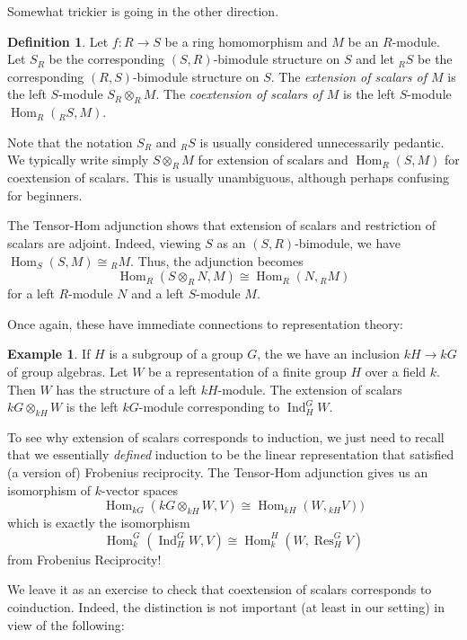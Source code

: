 \documentclass[12pt]{article}
\theoremstyle{plain}
\theoremstyle{definition}
\newtheorem{definition}[theorem]{Definition}
\newtheorem{example}[theorem]{Example}
\theoremstyle{remark}
\numberwithin{equation}{section}
\begin{document}
Somewhat trickier is going in the other direction.

\begin{definition}
Let $f : R \to S$ be a ring homomorphism and $M$ be an $R$-module.
Let $S_R$ be the corresponding $(S,R)$-bimodule structure on $S$
and let ${}_RS$ be the corresponding $(R,S)$-bimodule structure on $S$.
The \emph{extension of scalars of $M$}
is the left $S$-module $S_R \otimes_R M$.
The \emph{coextension of scalars of $M$}
is the left $S$-module $\operatorname{Hom}_R({}_RS,M)$.
\end{definition}

Note that the notation $S_R$ and ${}_RS$ is usually considered
unnecessarily pedantic.
We typically write simply $S \otimes_R M$ for extension of scalars
and $\operatorname{Hom}_R(S,M)$ for coextension of scalars.
This is usually unambiguous, although perhaps confusing for beginners.

The Tensor-Hom adjunction shows that extension of scalars
and restriction of scalars are adjoint.
Indeed, viewing $S$ as an $(S,R)$-bimodule,
we have $\operatorname{Hom}_S(S,M) \cong {}_RM$.
Thus, the adjunction becomes
\[
\operatorname{Hom}_R(S \otimes_R N,M)
\cong \operatorname{Hom}_R(N,{}_RM)
\]
for a left $R$-module $N$ and a left $S$-module $M$.

Once again, these have immediate connections to representation theory:

\begin{example}
If $H$ is a subgroup of a group $G$, the we have an inclusion
$kH \to kG$ of group algebras.
Let $W$ be a representation of a finite group $H$ over a field $k$.
Then $W$ has the structure of a left $kH$-module.
The extension of scalars $kG \otimes_{kH} W$
is the left $kG$-module corresponding to $\operatorname{Ind}_H^G W$.
\end{example} 

To see why extension of scalars corresponds to induction, we just need
to recall that we essentially \emph{defined} induction to be the linear
representation that satisfied (a version of) Frobenius reciprocity.
The Tensor-Hom adjunction gives us an isomorphism of $k$-vector spaces
\[
\operatorname{Hom}_{kG}(kG \otimes_{kH} W,V)
\cong \operatorname{Hom}_{kH}(W,{}_{kH}V))
\]
which is exactly the isomorphism
\[
\operatorname{Hom}_k^G(\operatorname{Ind}_H^G W,V)
\cong \operatorname{Hom}_k^H(W,\operatorname{Res}_H^G V)
\]
from Frobenius Reciprocity!

We leave it as an exercise to check that coextension of scalars
corresponds to coinduction.  Indeed, the distinction is not important
(at least in our setting) in view of the following:
\end{document}
